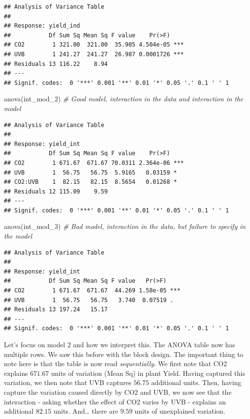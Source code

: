 \documentclass[
]{book}
\newenvironment{Shaded}{\begin{snugshade}}{\end{snugshade}}
\newcommand{\CommentTok}[1]{\textcolor[rgb]{0.56,0.35,0.01}{\textit{#1}}}
\newcommand{\FunctionTok}[1]{\textcolor[rgb]{0.00,0.00,0.00}{#1}}
\newcommand{\NormalTok}[1]{#1}
\begin{document}
\begin{verbatim}
## Analysis of Variance Table
## 
## Response: yield_ind
##           Df Sum Sq Mean Sq F value    Pr(>F)    
## CO2        1 321.00  321.00  35.905 4.504e-05 ***
## UVB        1 241.27  241.27  26.987 0.0001726 ***
## Residuals 13 116.22    8.94                      
## ---
## Signif. codes:  0 '***' 0.001 '**' 0.01 '*' 0.05 '.' 0.1 ' ' 1
\end{verbatim}

\begin{Shaded}
\begin{Highlighting}[]
\FunctionTok{anova}\NormalTok{(int\_mod\_2) }\CommentTok{\# Good model, interaction in the data and interaction in the model}
\end{Highlighting}
\end{Shaded}

\begin{verbatim}
## Analysis of Variance Table
## 
## Response: yield_int
##           Df Sum Sq Mean Sq F value    Pr(>F)    
## CO2        1 671.67  671.67 70.0311 2.364e-06 ***
## UVB        1  56.75   56.75  5.9165   0.03159 *  
## CO2:UVB    1  82.15   82.15  8.5654   0.01268 *  
## Residuals 12 115.09    9.59                      
## ---
## Signif. codes:  0 '***' 0.001 '**' 0.01 '*' 0.05 '.' 0.1 ' ' 1
\end{verbatim}

\begin{Shaded}
\begin{Highlighting}[]
\FunctionTok{anova}\NormalTok{(int\_mod\_3) }\CommentTok{\# Bad model, interaction in the data, but failure to specify in the model}
\end{Highlighting}
\end{Shaded}

\begin{verbatim}
## Analysis of Variance Table
## 
## Response: yield_int
##           Df Sum Sq Mean Sq F value   Pr(>F)    
## CO2        1 671.67  671.67  44.269 1.58e-05 ***
## UVB        1  56.75   56.75   3.740  0.07519 .  
## Residuals 13 197.24   15.17                     
## ---
## Signif. codes:  0 '***' 0.001 '**' 0.01 '*' 0.05 '.' 0.1 ' ' 1
\end{verbatim}

Let's focus on model 2 and how we interpret this. The ANOVA table now has multiple rows. We saw this before with the block design. The important thing to note here is that the table is now read \emph{sequentially}. We first note that CO2 explains \(671.67\) units of variation (Mean Sq) in plant Yield. Having captured this variation, we then note that UVB captures \(56.75\) additional units. Then, having capture the variation caused directly by CO2 and UVB, we now see that the interaction - asking whether the effect of CO2 varies by UVB - explains an additional \(82.15\) units. And\ldots{} there are \(9.59\) units of unexplained variation.
\end{document}

